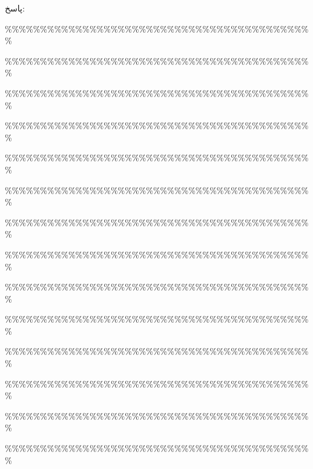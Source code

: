 \documentclass[10pt,letterpaper]{report}
\begin{document}
{\color{red}

پاسخ:


\%\%\%\%\%\%\%\%\%\%\%\%\%\%\%\%\%\%\%\%\%\%\%\%\%\%\%\%\%\%\%\%\%\%\%\%\%\%\%\%\%\%\%\%

\%\%\%\%\%\%\%\%\%\%\%\%\%\%\%\%\%\%\%\%\%\%\%\%\%\%\%\%\%\%\%\%\%\%\%\%\%\%\%\%\%\%\%\%

\%\%\%\%\%\%\%\%\%\%\%\%\%\%\%\%\%\%\%\%\%\%\%\%\%\%\%\%\%\%\%\%\%\%\%\%\%\%\%\%\%\%\%\%

\%\%\%\%\%\%\%\%\%\%\%\%\%\%\%\%\%\%\%\%\%\%\%\%\%\%\%\%\%\%\%\%\%\%\%\%\%\%\%\%\%\%\%\%

\%\%\%\%\%\%\%\%\%\%\%\%\%\%\%\%\%\%\%\%\%\%\%\%\%\%\%\%\%\%\%\%\%\%\%\%\%\%\%\%\%\%\%\%

\%\%\%\%\%\%\%\%\%\%\%\%\%\%\%\%\%\%\%\%\%\%\%\%\%\%\%\%\%\%\%\%\%\%\%\%\%\%\%\%\%\%\%\%

\%\%\%\%\%\%\%\%\%\%\%\%\%\%\%\%\%\%\%\%\%\%\%\%\%\%\%\%\%\%\%\%\%\%\%\%\%\%\%\%\%\%\%\%

\%\%\%\%\%\%\%\%\%\%\%\%\%\%\%\%\%\%\%\%\%\%\%\%\%\%\%\%\%\%\%\%\%\%\%\%\%\%\%\%\%\%\%\%

\%\%\%\%\%\%\%\%\%\%\%\%\%\%\%\%\%\%\%\%\%\%\%\%\%\%\%\%\%\%\%\%\%\%\%\%\%\%\%\%\%\%\%\%

\%\%\%\%\%\%\%\%\%\%\%\%\%\%\%\%\%\%\%\%\%\%\%\%\%\%\%\%\%\%\%\%\%\%\%\%\%\%\%\%\%\%\%\%

\%\%\%\%\%\%\%\%\%\%\%\%\%\%\%\%\%\%\%\%\%\%\%\%\%\%\%\%\%\%\%\%\%\%\%\%\%\%\%\%\%\%\%\%

\%\%\%\%\%\%\%\%\%\%\%\%\%\%\%\%\%\%\%\%\%\%\%\%\%\%\%\%\%\%\%\%\%\%\%\%\%\%\%\%\%\%\%\%

\%\%\%\%\%\%\%\%\%\%\%\%\%\%\%\%\%\%\%\%\%\%\%\%\%\%\%\%\%\%\%\%\%\%\%\%\%\%\%\%\%\%\%\%

\%\%\%\%\%\%\%\%\%\%\%\%\%\%\%\%\%\%\%\%\%\%\%\%\%\%\%\%\%\%\%\%\%\%\%\%\%\%\%\%\%\%\%\%










}





\end{document}
